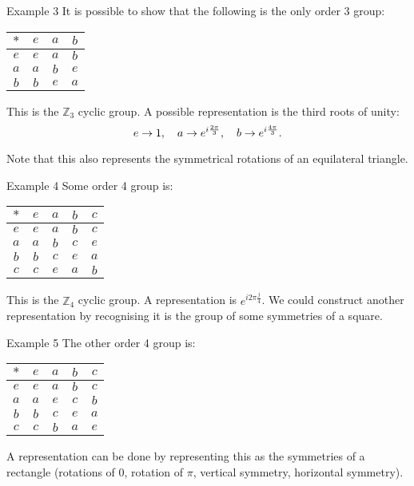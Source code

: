 \documentclass[a4paper]{article}
\begin{document}
\begin{parag}{Example 3}
    It is possible to show that the following is the only order 3 group:
    \begin{center}
    \begin{tabular}{c|ccc}
        $*$ & $e$ & $a$ & $b$ \\
        \hline
        $e$ & $e$ & $a$ & $b$ \\
        $a$ & $a$ & $b$ & $e$ \\
        $b$ & $b$ & $e$& $a$
    \end{tabular}
    \end{center}

    This is the $\mathbb{Z}_3$ cyclic group. A possible representation is the third roots of unity: 
    \[e \to 1, \quad a \to e^{i \frac{2\pi}{3}}, \quad b \to e^{i \frac{4 \pi}{3}}.\]

    Note that this also represents the symmetrical rotations of an equilateral triangle.
\end{parag}

\begin{parag}{Example 4}
    Some order 4 group is:
    \begin{center}
    \begin{tabular}{c|cccc}
        $*$ & $e$ & $a$ & $b$ & $c$  \\
        \hline
        $e$ & $e$ & $a$ & $b$ & $c$ \\
        $a$ & $a$ & $b$ & $c$ & $e$  \\
        $b$ & $b$ & $c$ & $e$ & $a$ \\
        $c$ & $c$ & $e$ & $a$ & $b$ \\
    \end{tabular}
    \end{center}

    This is the $\mathbb{Z}_4$ cyclic group. A representation is $e^{i 2\pi \frac{j}{4}}$. We could construct another representation by recognising it is the group of some symmetries of a square.
\end{parag}

\begin{parag}{Example 5}
    The other order 4 group is:  
    \begin{center}
    \begin{tabular}{c|cccc}
        $*$ & $e$ & $a$ & $b$ & $c$  \\
        \hline
        $e$ & $e$ & $a$ & $b$ & $c$ \\
        $a$ & $a$ & $e$ & $c$ & $b$  \\
        $b$ & $b$ & $c$ & $e$ & $a$ \\
        $c$ & $c$ & $b$ & $a$ & $e$ \\
    \end{tabular}
    \end{center}

    A representation can be done by representing this as the symmetries of a rectangle (rotations of $0$, rotation of $\pi$, vertical symmetry, horizontal symmetry).
\end{parag}
\end{document}
